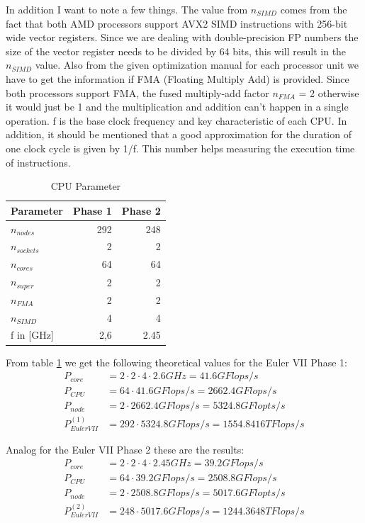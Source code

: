 \documentclass[unicode,11pt,a4paper,oneside,numbers=endperiod,openany]{scrartcl}
\begin{document}
In addition I want to note a few things. The value from $n_{SIMD}$ comes from the fact that both AMD processors support AVX2 SIMD instructions
with 256-bit wide vector registers. Since we are dealing with double-precision FP numbers the size of the vector register needs to be divided
by 64 bits, this will result in the $n_{SIMD}$ value. Also from the given optimization manual for each processor unit we have to get the information
if FMA (Floating Multiply Add) is provided. Since both processors support FMA, the fused multiply-add factor $n_{FMA}$ = 2 otherwise it would just be 1
and the multiplication and addition can't happen in a single operation. f is the base clock frequency and key characteristic of each CPU. In addition,
it should be mentioned that a good approximation for the duration of one clock cycle is given by 1/f. This number helps measuring the execution time
of instructions. 
\begin{table}[h]
    \centering
    \begin{tabular}{lrr}
      \hline
      Parameter & Phase 1 & Phase 2 \\
      \hline
      $n_{nodes}$ & 292 & 248\\
      $n_{sockets}$ & 2 & 2\\
      $n_{cores}$ & 64 & 64\\
      $n_{super}$ & 2 & 2\\
      $n_{FMA}$ & 2 & 2\\
      $n_{SIMD}$ & 4 & 4\\
      f in [GHz] & 2,6 & 2.45\\
      \hline
    \end{tabular}
    \caption{CPU Parameter}
    \label{tab:CPU_par}
  \end{table}

From table \ref{tab:CPU_par} we get the following theoretical values for the Euler VII Phase 1:
\begin{align*}
    P_{core} &= 2 \cdot 2 \cdot 4 \cdot 2.6 GHz = 41.6 GFlops/s \\
    P_{CPU} &= 64 \cdot 41.6 GFlops/s = 2662.4 GFlops/s \\
    P_{node} &= 2 \cdot 2662.4 GFlops/s = 5324.8 GFlopts/s \\
    P_{Euler VII}^{(1)} &= 292 \cdot 5324.8 GFlops/s = 1554.8416 TFlops/s
\end{align*}

Analog for the Euler VII Phase 2 these are the results:
\begin{align*}
    P_{core} &= 2 \cdot 2 \cdot 4 \cdot 2.45 GHz = 39.2 GFlops/s \\
    P_{CPU} &= 64 \cdot 39.2 GFlops/s = 2508.8 GFlops/s \\
    P_{node} &= 2 \cdot 2508.8 GFlops/s = 5017.6 GFlopts/s \\
    P_{Euler VII}^{(2)} &= 248 \cdot 5017.6 GFlops/s = 1244.3648 TFlops/s
\end{align*}
\end{document}
